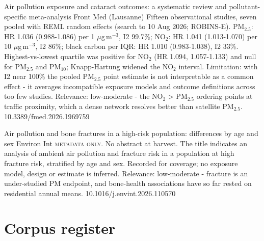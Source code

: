 \documentclass[10pt]{article}
\begin{document}
{Air pollution exposure and cataract outcomes: a systematic review and pollutant-specific meta-analysis}
{Front Med (Lausanne)}
{Fifteen observational studies, seven pooled with REML random effects (search to 10 Aug 2026; ROBINS-E). PM$_{2.5}$: HR 1.036 (0.988-1.086) per 1 $\mu$g\,m$^{-3}$, I2 99.7\%; NO$_2$: HR 1.041 (1.013-1.070) per 10 $\mu$g\,m$^{-3}$, I2 86\%; black carbon per IQR: HR 1.010 (0.983-1.038), I2 33\%. Highest-vs-lowest quartile was positive for NO$_2$ (HR 1.094, 1.057-1.133) and null for PM$_{2.5}$ and PM$_{10}$; Knapp-Hartung widened the NO$_2$ interval. Limitation: with I2 near 100\% the pooled PM$_{2.5}$ point estimate is not interpretable as a common effect - it averages incompatible exposure models and outcome definitions across too few studies. Relevance: low-moderate - the NO$_2$ > PM$_{2.5}$ ordering points at traffic proximity, which a dense network resolves better than satellite PM$_{2.5}$.}
{10.3389/fmed.2026.1969759}

{Air pollution and bone fractures in a high-risk population: differences by age and sex}
{Environ Int}
{\textsc{metadata only.} No abstract at harvest. The title indicates an analysis of ambient air pollution and fracture risk in a population at high fracture risk, stratified by age and sex. Recorded for coverage; no exposure model, design or estimate is inferred. Relevance: low-moderate - fracture is an under-studied PM endpoint, and bone-health associations have so far rested on residential annual means.}
{10.1016/j.envint.2026.110570}

\clearpage
\section*{\sffamily\bfseries\color{Deep}Corpus register}
\vspace{-1.5mm}{\color{Amber}\rule{\linewidth}{1.1pt}}\vspace{2.5mm}



\vspace{2mm}
\end{document}
